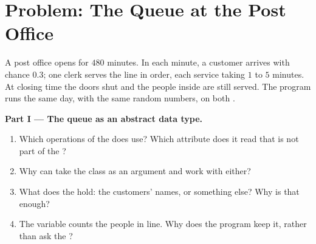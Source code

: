 \section{Problem: The Queue at the Post Office}\label{sec:g12:lists-stacks-queues:problem}

\begin{problem}\label{pb:g12:lists-stacks-queues:1}
A post office opens for $480$ minutes. In each minute, a customer arrives with chance $0.3$; one clerk serves the
line in order, each service taking $1$ to $5$ minutes. At closing time the doors shut and the people inside are still
served. The program runs the same day, with the same random numbers, on both .

\label{lst:g12:lists-stacks-queues:post}

%
\label{out:g12:lists-stacks-queues:post}

\medskip\noindent\textbf{Part I --- The queue as an abstract data type.}
\begin{enumerate}
  \item Which operations of the  does  use? Which attribute does it read that is not part of
    the ?
  \item Why can  take the class  as an argument and work with either?
  \item What does the  hold: the customers' names, or something else? Why is that enough?
  \item The variable  counts the people in line. Why does the program keep it, rather than ask the
    ?
\end{enumerate}


\end{problem}
